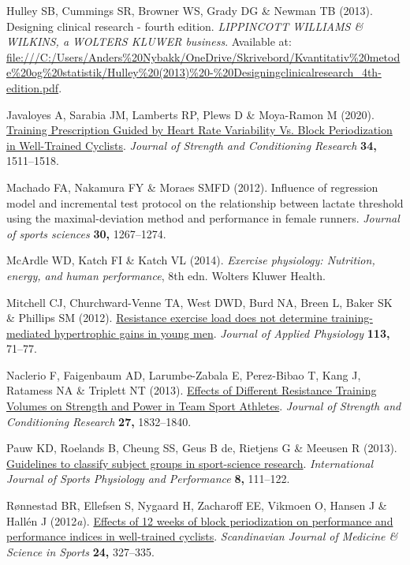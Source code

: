 \documentclass[
  letterpaper,
  DIV=11,
  numbers=noendperiod]{scrreprt}
\newlength{\cslhangindent}
\newenvironment{CSLReferences}[2] %
 {\begin{list}{}{%
  \setlength{\itemindent}{0pt}
  \setlength{\leftmargin}{0pt}
  \setlength{\parsep}{0pt}
  \ifodd #1
   \setlength{\leftmargin}{\cslhangindent}
   \setlength{\itemindent}{-1\cslhangindent}
  \fi
  \setlength{\itemsep}{#2\baselineskip}}}
 {\end{list}}
\begin{document}
\begin{CSLReferences}{1}{1}
Hulley SB, Cummings SR, Browner WS, Grady DG \& Newman TB (2013).
Designing clinical research - fourth edition. \emph{LIPPINCOTT WILLIAMS
\& WILKINS, a WOLTERS KLUWER business}. Available at:
\url{file:///C:/Users/Anders\%20Nybakk/OneDrive/Skrivebord/Kvantitativ\%20metode\%20og\%20statistik/Hulley\%20(2013)\%20-\%20Designingclinicalresearch_4th-edition.pdf}.

Javaloyes A, Sarabia JM, Lamberts RP, Plews D \& Moya-Ramon M (2020).
\href{https://doi.org/10.1519/jsc.0000000000003337}{Training
Prescription Guided by Heart Rate Variability Vs. Block Periodization in
Well-Trained Cyclists}. \emph{Journal of Strength and Conditioning
Research} \textbf{34,} 1511--1518.

Machado FA, Nakamura FY \& Moraes SMFD (2012). Influence of regression
model and incremental test protocol on the relationship between lactate
threshold using the maximal-deviation method and performance in female
runners. \emph{Journal of sports sciences} \textbf{30,} 1267--1274.

McArdle WD, Katch FI \& Katch VL (2014). \emph{Exercise physiology:
Nutrition, energy, and human performance}, 8th edn. Wolters Kluwer
Health.

Mitchell CJ, Churchward-Venne TA, West DWD, Burd NA, Breen L, Baker SK
\& Phillips SM (2012).
\href{https://doi.org/10.1152/japplphysiol.00307.2012}{Resistance
exercise load does not determine training-mediated hypertrophic gains in
young men}. \emph{Journal of Applied Physiology} \textbf{113,} 71--77.

Naclerio F, Faigenbaum AD, Larumbe-Zabala E, Perez-Bibao T, Kang J,
Ratamess NA \& Triplett NT (2013).
\href{https://doi.org/10.1519/jsc.0b013e3182736d10}{Effects of Different
Resistance Training Volumes on Strength and Power in Team Sport
Athletes}. \emph{Journal of Strength and Conditioning Research}
\textbf{27,} 1832--1840.

Pauw KD, Roelands B, Cheung SS, Geus B de, Rietjens G \& Meeusen R
(2013). \href{https://doi.org/10.1123/ijspp.8.2.111}{Guidelines to
classify subject groups in sport-science research}. \emph{International
Journal of Sports Physiology and Performance} \textbf{8,} 111--122.

Rønnestad BR, Ellefsen S, Nygaard H, Zacharoff EE, Vikmoen O, Hansen J
\& Hallén J (2012\emph{a}).
\href{https://doi.org/10.1111/sms.12016}{Effects of 12 weeks of block
periodization on performance and performance indices in well{-}trained
cyclists}. \emph{Scandinavian Journal of Medicine \& Science in Sports}
\textbf{24,} 327--335.


\end{CSLReferences}
\end{document}

